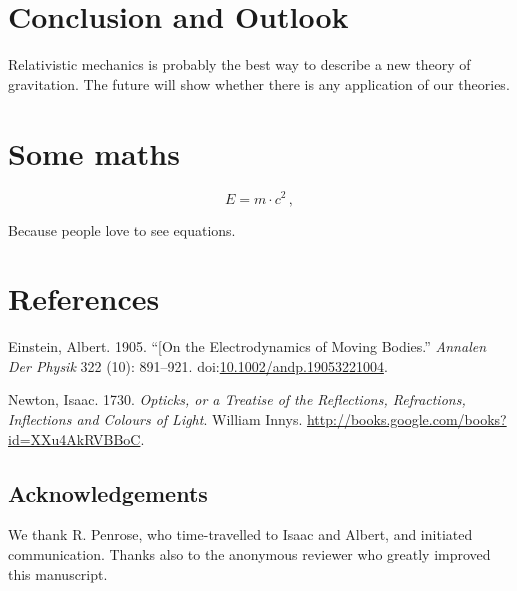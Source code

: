 \documentclass[A4paper,]{article}
\begin{document}
\section{Conclusion and Outlook}\label{conclusion-and-outlook}

Relativistic mechanics is probably the best way to describe a new theory of gravitation.
The future will show whether there is any application of our theories.

\appendix

\section{Some maths}\label{some-maths}

\begin{equation} E = m\cdot c^2\,, \label{eq:emc2}\end{equation}

Because people love to see equations.

\section*{References}\label{references}

\hypertarget{refs}{}
\hypertarget{ref-Einstein1905}{}
Einstein, Albert. 1905. ``{[}On the Electrodynamics of Moving Bodies.'' \emph{Annalen Der Physik} 322 (10): 891--921. doi:\href{https://doi.org/10.1002/andp.19053221004}{10.1002/andp.19053221004}.

\hypertarget{ref-Newton1730}{}
Newton, Isaac. 1730. \emph{Opticks, or a Treatise of the Reflections, Refractions, Inflections and Colours of Light}. William Innys. \url{http://books.google.com/books?id=XXu4AkRVBBoC}.

\subsection{Acknowledgements}
{\small We thank R. Penrose, who time-travelled to Isaac and Albert, and initiated communication.
Thanks also to the anonymous reviewer who greatly improved this manuscript.}
\end{document}
